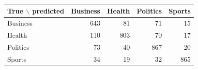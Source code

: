 \begin{tabular}{lrrrr}
\toprule
True $\backslash$ predicted & Business & Health & Politics & Sports \\
\midrule
Business & 643 & 81 & 71 & 15 \\
Health & 110 & 803 & 70 & 17 \\
Politics & 73 & 40 & 867 & 20 \\
Sports & 34 & 19 & 32 & 865 \\
\bottomrule
\end{tabular}
